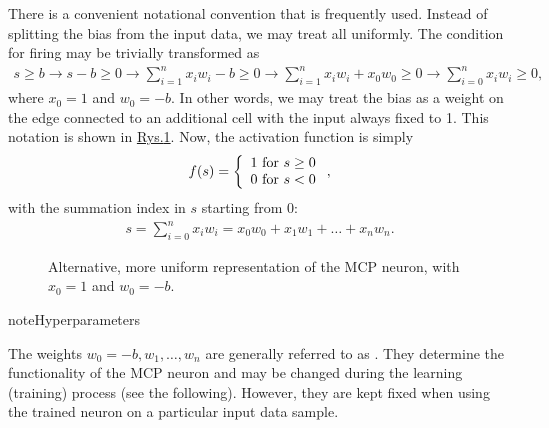 \documentclass[a4paper,12pt,polish]{jupyterBook}
\let\sphinxpxdimen\pdfpxdimen\else\newdimen\sphinxpxdimen
\begin{document}
\sphinxAtStartPar
There is a convenient notational convention that is frequently used. Instead of splitting the bias from the input data, we may treat all uniformly. The condition for firing may be trivially transformed as
\begin{equation*}
\begin{split}
s \ge b  \to s-b \ge 0 \to \sum_{i=1}^n x_i w_i - b \ge 0 \to \sum_{i=1}^n x_i w_i +x_0 w_0 \ge 0 
\to \sum_{i=0}^n x_i w_i \ge 0,
\end{split}
\end{equation*}
\sphinxAtStartPar
where \(x_0=1\) and \(w_0=-b\). In other words, we may treat the bias as a weight on the edge connected to an additional cell with the input always fixed to 1. This notation is shown in \hyperref[\detokenize{docs/mcp:mcp2-fig}]{Rys.\@ \ref{\detokenize{docs/mcp:mcp2-fig}}}. Now, the activation function is simply
\begin{equation}\label{equation:docs/mcp:eq-f}
\begin{split}f(s) = \left \{ \begin{array}{l} 1 {\rm ~for~} s \ge 0 \\ 0 {\rm ~for~} s < 0 \end{array} \right .,\end{split}
\end{equation}
\sphinxAtStartPar
with the summation index in \(s\) starting from \(0\):
\begin{equation}\label{equation:docs/mcp:eq-f0}
\begin{split}s=\sum_{i=0}^n x_i w_i = x_0 w_0+x_1 w_1 + \dots + x_n w_n.\end{split}
\end{equation}
\begin{figure}[htbp]
\centering
\capstart

\noindent\sphinxincludegraphics[width=320\sphinxpxdimen]{{mcp-2a}.png}
\caption{Alternative, more uniform representation of the MCP neuron, with \(x_0=1\) and \(w_0=-b\).}\label{\detokenize{docs/mcp:mcp2-fig}}\end{figure}

\begin{sphinxadmonition}{note}{Hyperparameters}

\sphinxAtStartPar
The weights \(w_0=-b,w_1,\dots,w_n\) are generally referred to as . They determine the functionality of the MCP neuron and may be changed during the learning (training) process (see the following). However, they are kept fixed when using the trained neuron on a particular input data sample.
\end{sphinxadmonition}
\end{document}
